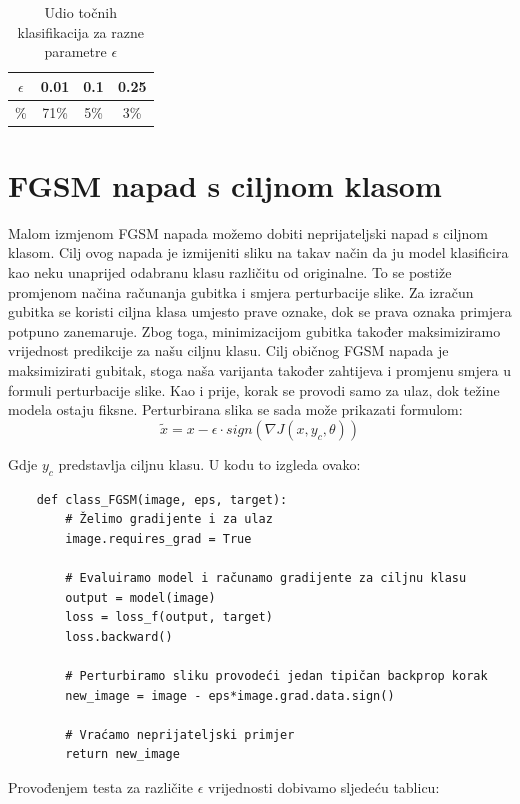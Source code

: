 \begin{table}[H]
	\centering
	\begin{tabular}{||c || c | c | c||} 
		\hline
		$\epsilon$ & 0.01 & 0.1 & 0.25 \\ [0.5ex] 
		\hline\hline
		\% & 71\% & 5\% & 3\% \\ 
		\hline
	\end{tabular}
	\caption{Udio točnih klasifikacija za razne parametre $\epsilon$}
\end{table}

\section{FGSM napad s ciljnom klasom}

Malom izmjenom FGSM napada možemo dobiti neprijateljski napad s ciljnom klasom. Cilj ovog napada je izmijeniti sliku na takav način da ju model klasificira kao neku unaprijed odabranu klasu različitu od originalne. To se postiže promjenom načina računanja gubitka i smjera perturbacije slike. Za izračun gubitka se koristi ciljna klasa umjesto prave oznake, dok se prava oznaka primjera potpuno zanemaruje.  Zbog toga, minimizacijom gubitka također maksimiziramo vrijednost predikcije za našu ciljnu klasu. Cilj običnog FGSM napada je maksimizirati gubitak, stoga naša varijanta također zahtijeva i promjenu smjera u formuli perturbacije slike. Kao i prije, korak se provodi samo za ulaz, dok težine modela ostaju fiksne. Perturbirana slika se sada može prikazati formulom: 
\[\widetilde{x} = x - \epsilon\cdot sign\left(\nabla J(x, y_c, \theta)\right)\]

Gdje $y_c$ predstavlja ciljnu klasu. U kodu to izgleda ovako:

\begin{verbatim}
    def class_FGSM(image, eps, target):
        # Želimo gradijente i za ulaz
        image.requires_grad = True

        # Evaluiramo model i računamo gradijente za ciljnu klasu
        output = model(image)
        loss = loss_f(output, target)
        loss.backward()

        # Perturbiramo sliku provodeći jedan tipičan backprop korak
        new_image = image - eps*image.grad.data.sign()

        # Vraćamo neprijateljski primjer
        return new_image
\end{verbatim}

Provođenjem testa za različite $\epsilon$ vrijednosti dobivamo sljedeću tablicu:

